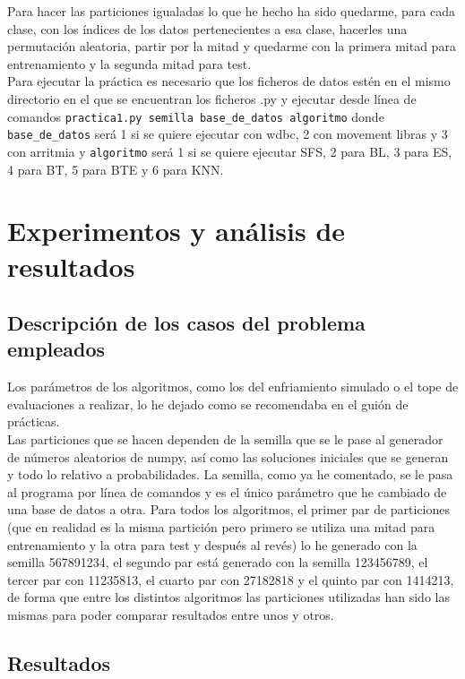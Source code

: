 \documentclass[12pt]{article}
\begin{document}
Para hacer las particiones igualadas lo que he hecho ha sido quedarme, para cada clase, con los índices de los datos pertenecientes a esa clase, hacerles una permutación aleatoria, partir por la mitad y quedarme con la primera mitad para entrenamiento y la segunda mitad para test.\\

Para ejecutar la práctica es necesario que los ficheros de datos estén en el mismo directorio en el que se encuentran los ficheros .py y ejecutar desde línea de comandos \texttt{practica1.py semilla base\_de\_datos algoritmo} donde \texttt{base\_de\_datos} será 1 si se quiere ejecutar con wdbc, 2 con movement libras y 3 con arritmia y \texttt{algoritmo} será 1 si se quiere ejecutar SFS, 2 para BL, 3 para ES, 4 para BT, 5 para BTE y 6 para KNN.

\newpage

\section{Experimentos y análisis de resultados}
\subsection{Descripción de los casos del problema empleados}

Los parámetros de los algoritmos, como los del enfriamiento simulado o el tope de evaluaciones a realizar, lo he dejado como se recomendaba en el guión de prácticas.\\
Las particiones que se hacen dependen de la semilla que se le pase al generador de números aleatorios de numpy, así como las soluciones iniciales que se generan y todo lo relativo a probabilidades. La semilla, como ya he comentado, se le pasa al programa por línea de comandos y es el único parámetro que he cambiado de una base de datos a otra. Para todos los algoritmos, el primer par de particiones (que en realidad es la misma partición pero primero se utiliza una mitad para entrenamiento y la otra para test y después al revés) lo he generado con la semilla 567891234, el segundo par está generado con la semilla 123456789, el tercer par con 11235813, el cuarto par con 27182818 y el quinto par con 1414213, de forma que entre los distintos algoritmos las particiones utilizadas han sido las mismas para poder comparar resultados entre unos y otros.

\subsection{Resultados}
\end{document}
